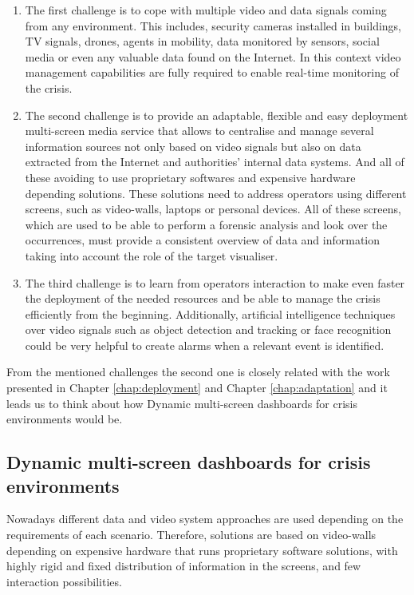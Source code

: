 \begin{enumerate}
\item The first challenge is to cope with multiple video and data signals coming from any environment. This includes, security cameras installed in buildings, TV signals, drones, agents in mobility, data monitored by sensors, social media or even any valuable data found on the Internet. In this context video management capabilities are fully required to enable real-time monitoring of the crisis. 

\item The second challenge is to provide an adaptable, flexible and easy deployment multi-screen media service that allows to centralise and manage several information sources not only based on video signals but also on data extracted from the Internet and authorities' internal data systems. And all of these avoiding to use proprietary softwares and expensive hardware depending solutions. These solutions need to address operators using different screens, such as video-walls, laptops or personal devices. All of these screens, which are used to be able to perform a forensic analysis and look over the occurrences, must provide a consistent overview of data and information taking into account the role of the target visualiser. 

\item The third challenge is to learn from operators interaction to make even faster the deployment of the needed resources and be able to manage the crisis efficiently from the beginning. Additionally, artificial intelligence techniques over video signals such as object detection and tracking or face recognition could be very helpful to create alarms when a relevant event is identified. 
\end{enumerate}

From the mentioned challenges the second one is closely related with the work presented in Chapter \ref{chap:deployment} and Chapter \ref{chap:adaptation} and it leads us to think about how Dynamic multi-screen dashboards for crisis environments would be. 

\subsection{Dynamic multi-screen dashboards for crisis environments}

Nowadays different data and video system approaches are used depending on the requirements of each scenario. Therefore, solutions are based on video-walls depending on expensive hardware that runs proprietary software solutions, with highly rigid and fixed distribution of information in the screens, and few interaction possibilities.


